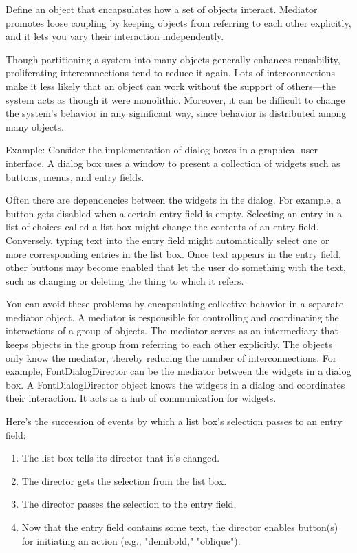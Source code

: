 \documentclass[11pt]{report}
\begin{document}
Define an object that encapsulates how a set of objects interact.
Mediator promotes loose coupling by keeping objects from referring to
each other explicitly, and it lets you vary their interaction independently.

Though partitioning a system into many objects generally enhances
reusability, proliferating interconnections tend to reduce it again.
Lots of interconnections make it less likely that an object can work
without the support of others---the system acts as though it were
monolithic. Moreover, it can be difficult to change the system's
behavior in any significant way, since behavior is distributed among
many objects.

Example: Consider the implementation of dialog boxes in a
graphical user interface. A dialog box uses a window to present a
collection of widgets such as buttons, menus, and entry fields.

Often there are dependencies between the widgets in the dialog. For example, 
a button gets disabled when a certain entry field is empty. Selecting an entry 
in a list of choices called a list box might change the contents of an entry field. 
Conversely, typing text into the entry field might automatically select one or more
corresponding entries in the list box. Once text appears in the entry field, 
other buttons may become enabled that let the user do something
with the text, such as changing or deleting the thing to which it refers.

You can avoid these problems by encapsulating collective behavior in a separate mediator object. 
A mediator is responsible for controlling and coordinating the interactions of a group of objects.
The mediator serves as an intermediary that keeps objects in the group
from referring to each other explicitly. 
The objects only know the mediator, thereby reducing the number of interconnections.
For example, FontDialogDirector can be the mediator between the widgets in a dialog box. 
A FontDialogDirector object knows
the widgets in a dialog and coordinates their interaction. 
It acts as a hub of communication for widgets.

Here's the succession of events by which a list box's selection passes to an entry field:
\begin{enumerate}
\item The list box tells its director that it's changed.
\item The director gets the selection from the list box.
\item The director passes the selection to the entry field.
\item Now that the entry field contains some text, the director enables button(s)
for initiating an action (e.g., "demibold," "oblique").
\end{enumerate}
\end{document}
